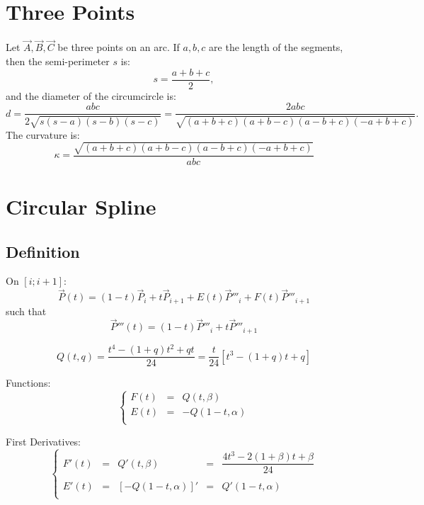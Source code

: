 \documentclass[aps,12pt]{revtex4}
\begin{document}
\section{Three Points}

Let $\vec{A}, \vec{B}, \vec{C}$ be three points on an arc.
If $a,b,c$ are the length of the segments, then the semi-perimeter $s$ is:
\begin{equation}
s = \dfrac{a+b+c}{2},
\end{equation}
and the diameter of the circumcircle is:
\begin{equation}
	d = \dfrac{abc}{2\sqrt{s(s-a)(s-b)(s-c)}} = \dfrac{2abc}{\sqrt{(a+b+c)(a+b-c)(a-b+c)(-a+b+c)}}.
\end{equation}
The curvature is:
\begin{equation}
	\kappa = \dfrac{\sqrt{(a+b+c)(a+b-c)(a-b+c)(-a+b+c)}}{abc}
\end{equation}

\section{Circular Spline}

\subsection{Definition}

On $[i;i+1]$:
\begin{equation}
	\vec{P}(t) = (1-t) \vec{P}_i + t \vec{P}_{i+1} + E(t) \vec{P}'''_i + F(t) \vec{P}'''_{i+1}
\end{equation}
such that
\begin{equation}
	\vec{P}'''(t) = (1-t) \vec{P}'''_i + t \vec{P}'''_{i+1}
\end{equation}

\begin{equation}
	Q(t,q) = \dfrac{t^4 - (1+q) t ^2 + q  t}{24} = \dfrac{t}{24}\left[ t^3 - (1+q) t + q\right]
\end{equation}

Functions:
\begin{equation}
\left\lbrace
\begin{array}{rcl}
	F(t) & = &Q(t,\beta)\\
	E(t) & = &-Q(1-t,\alpha)\\
\end{array}
\right.
\end{equation}

First Derivatives:
\begin{equation}
\left\lbrace
\begin{array}{rcccl}
	F'(t) & = &Q'(t,\beta) & = & \dfrac{4t^3 - 2(1+\beta) t  + \beta  }{24}\\
	\\
	E'(t) & = &\left[-Q(1-t,\alpha)\right]' & = & Q'(1-t,\alpha)\\
\end{array}
\right.
\end{equation}
\end{document}
